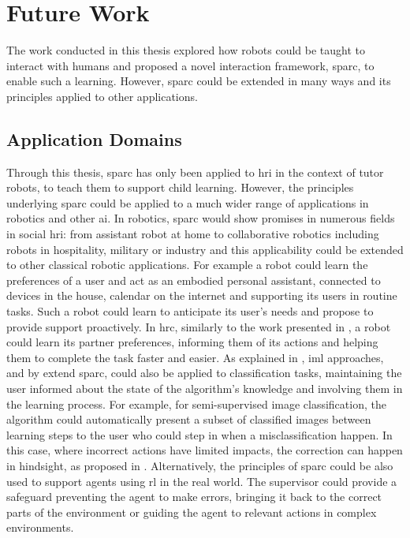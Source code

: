 \section{Future Work}
The work conducted in this thesis explored how robots could be taught to interact with humans and proposed a novel interaction framework, \gls{sparc}, to enable such a learning. However, \gls{sparc} could be extended in many ways and its principles applied to other applications.

\subsection{Application Domains}

Through this thesis, \gls{sparc} has only been applied to \gls{hri} in the context of tutor robots, to teach them to support child learning. However, the principles underlying \gls{sparc} could be applied to a much wider range of applications in robotics and other \gls{ai}. In robotics, \gls{sparc} would show promises in numerous fields in social \gls{hri}: from assistant robot at home to collaborative robotics including robots in hospitality, military or industry and this applicability could be extended to other classical robotic applications. For example a robot could learn the preferences of a user and act as an embodied personal assistant, connected to devices in the house, calendar on the internet and supporting its users in routine tasks. Such a robot could learn to anticipate its user's needs and propose to provide support proactively. In \gls{hrc}, similarly to the work presented in \cite{munzer2017efficient}, a robot could learn its partner preferences, informing them of its actions and helping them to complete the task faster and easier. As explained in \cite{fails2003interactive}, \gls{iml} approaches, and by extend \gls{sparc}, could also be applied to classification tasks, maintaining the user informed about the state of the algorithm's knowledge and involving them in the learning process. For example, for semi-supervised image classification, the algorithm could automatically present a subset of classified images between learning steps to the user who could step in when a misclassification happen. In this case, where incorrect actions have limited impacts, the correction can happen in hindsight, as proposed in \cite{chernova2009interactive}. Alternatively, the principles of \gls{sparc} could be also used to support agents using \gls{rl} in the real world. The supervisor could provide a safeguard preventing the agent to make errors, bringing it back to the correct parts of the environment or guiding the agent to relevant actions in complex environments.

